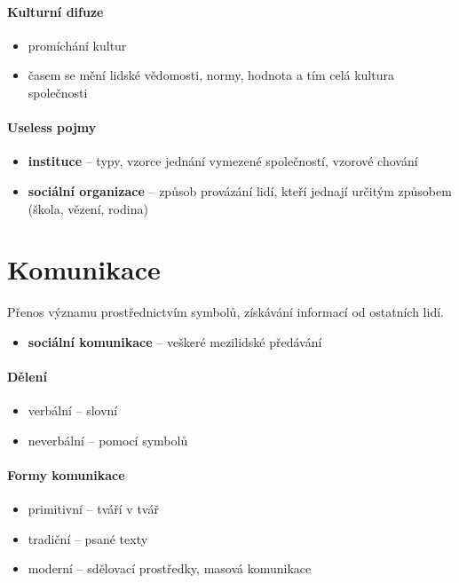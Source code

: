 \paragraph{Kulturní difuze}
\begin{itemize}
\item promíchání kultur
\item časem se mění lidské vědomosti, normy, hodnota a tím celá kultura společnosti
\end{itemize}

\paragraph{Useless pojmy}
\begin{itemize}
\item \textbf{instituce} -- typy, vzorce jednání vymezené společností, vzorové chování
\item \textbf{sociální organizace} -- způsob provázání lidí, kteří jednají určitým způsobem (škola, vězení, rodina)
\end{itemize}




\section{Komunikace}
Přenos významu prostřednictvím symbolů, získávání informací od ostatních lidí.
\begin{itemize}
\item \textbf{sociální komunikace} -- veškeré mezilidské předávání 
\end{itemize}

\paragraph{Dělení}
\begin{itemize}
\item verbální -- slovní
\item neverbální -- pomocí symbolů
\end{itemize}

\paragraph{Formy komunikace}
\begin{itemize}
\item primitivní -- tváří v tvář
\item tradiční -- psané texty
\item moderní -- sdělovací prostředky, masová komunikace
\end{itemize}


